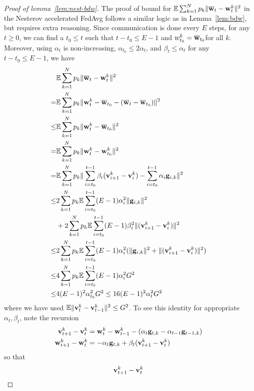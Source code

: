 \begin{proof}[Proof of lemma~\ref{lem:nest-bdw}]
	The proof of bound for $\mathbb{E}\sum_{k=1}^{N}p_{k}\|{\overline{\mathbf{w}}}_{t}-{\mathbf{w}}_{t}^{k}\|^{2}$ in the Nesterov accelerated FedAvg follows a similar logic as in Lemma~\ref{lem:bdw}, but requires extra reasoning.  
Since communication is done every $E$ steps, for any $t\geq0$, we
can find a $t_{0}\leq t$ such that $t-t_{0}\leq E-1$ and $w_{t_{0}}^{k}={\overline{\mathbf{w}}}_{t_{0}}$for
all $k$. Moreover, using $\alpha_{t}$ is non-increasing, $\alpha_{t_{0}}\leq2\alpha{}_{t}$,
and $\beta_{t}\leq\alpha_{t}$ for any $t-t_{0}\leq E-1$, we have
\begin{align*}
& \mathbb{E}\sum_{k=1}^{N}p_{k}\|{\overline{\mathbf{w}}}_{t}-{\mathbf{w}}_{t}^{k}\|^{2} \\ 
=&\mathbb{E}\sum_{k=1}^{N}p_{k}\|{\mathbf{w}}_{t}^{k}-{\overline{\mathbf{w}}}_{t_{0}}-({\overline{\mathbf{w}}}_{t}-{\overline{\mathbf{w}}}_{t_{0}})\|^{2}\\
\leq &\mathbb{E}\sum_{k=1}^{N}p_{k}\|{\mathbf{w}}_{t}^{k}-{\overline{\mathbf{w}}}_{t_{0}}\|^{2}\\
= &\mathbb{E}\sum_{k=1}^{N}p_{k}\|{\mathbf{w}}_{t}^{k}-{\mathbf{w}}_{t_{0}}^{k}\|^{2}\\
= &\mathbb{E}\sum_{k=1}^{N}p_{k}\|\sum_{i=t_{0}}^{t-1}\beta_{i}({\mathbf{v}}_{i+1}^{k}-{\mathbf{v}}_{i}^{k})-\sum_{i=t_{0}}^{t-1}\alpha_{i}{\mathbf{g}}_{i,k}\|^{2}\\
\leq &2\sum_{k=1}^{N}p_{k}\mathbb{E}\sum_{i=t_{0}}^{t-1}(E-1)\alpha_{i}^{2}\|{\mathbf{g}}_{i,k}\|^{2}\\
&+2\sum_{k=1}^{N}p_{k}\mathbb{E}\sum_{i=t_{0}}^{t-1}(E-1)\beta_{i}^{2}\|({\mathbf{v}}_{i+1}^{k}-{\mathbf{v}}_{i}^{k})\|^{2}\\
\leq &2\sum_{k=1}^{N}p_{k}\mathbb{E}\sum_{i=t_{0}}^{t-1}(E-1)\alpha_{i}^{2}(\|{\mathbf{g}}_{i,k}\|^{2}+\|({\mathbf{v}}_{i+1}^{k}-{\mathbf{v}}_{i}^{k})\|^{2})\\
\leq &4\sum_{k=1}^{N}p_{k}\mathbb{E}\sum_{i=t_{0}}^{t-1}(E-1)\alpha_{i}^{2}G^{2}\\
\leq &4(E-1)^{2}\alpha_{t_{0}}^{2}G^{2}\leq16(E-1)^{2}\alpha_{t}^{2}G^{2}
\end{align*}
where we have used $\mathbb{E}\|{\mathbf{v}}_{t}^{k}-{\mathbf{v}}_{t-1}^{k}\|^{2}\leq G^{2}$.
To see this identity for appropriate $\alpha_{t},\beta_{t}$, note
the recursion 
\begin{align*}
{\mathbf{v}}_{t+1}^{k}-{\mathbf{v}}_{t}^{k} & ={\mathbf{w}}_{t}^{k}-{\mathbf{w}}_{t-1}^{k}-(\alpha_{t}{\mathbf{g}}_{t,k}-\alpha_{t-1}{\mathbf{g}}_{t-1,k})\\
{\mathbf{w}}_{t+1}^{k}-{\mathbf{w}}_{t}^{k} & =-\alpha_{t}{\mathbf{g}}_{t,k}+\beta_{t}({\mathbf{v}}_{t+1}^{k}-{\mathbf{v}}_{t}^{k})
\end{align*}
so that 
\begin{align*}
 & \vv_{t+1}^{k}-\vv_{t}^{k} \\

\end{align*}
\end{proof}

